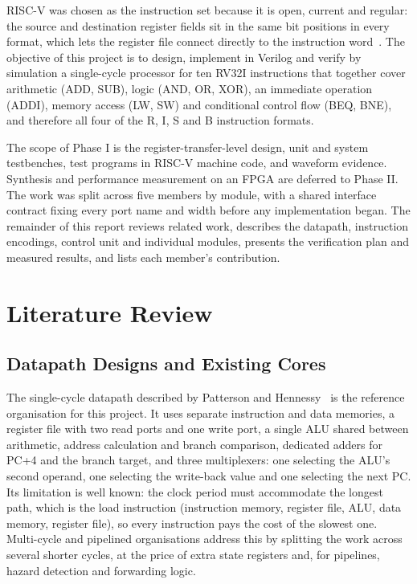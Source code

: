 \documentclass[conference]{IEEEtran}
\begin{document}
RISC-V was chosen as the instruction set because it is open, current and
regular: the source and destination register fields sit in the same bit
positions in every format, which lets the register file connect directly to
the instruction word~\cite{riscv_unpriv_2026,waterman2016design}. The
objective of this project is to design, implement in Verilog and verify by
simulation a single-cycle processor for ten RV32I instructions that together
cover arithmetic (ADD, SUB), logic (AND, OR, XOR), an immediate operation
(ADDI), memory access (LW, SW) and conditional control flow (BEQ, BNE), and
therefore all four of the R, I, S and B instruction formats.

The scope of Phase I is the register-transfer-level design, unit and system
testbenches, test programs in RISC-V machine code, and waveform evidence.
Synthesis and performance measurement on an FPGA are deferred to Phase II.
The work was split across five members by module, with a shared interface
contract fixing every port name and width before any implementation began.
The remainder of this report reviews related work, describes the datapath,
instruction encodings, control unit and individual modules, presents the
verification plan and measured results, and lists each member's contribution.

\section{Literature Review}


\subsection{Datapath Designs and Existing Cores}
The single-cycle datapath described by Patterson and
Hennessy~\cite{patterson2020computer} is the reference organisation for this
project. It uses separate instruction and data memories, a register file with
two read ports and one write port, a single ALU shared between arithmetic,
address calculation and branch comparison, dedicated adders for PC+4 and the
branch target, and three multiplexers: one selecting the ALU's second operand,
one selecting the write-back value and one selecting the next PC. Its
limitation is well known: the clock period must accommodate the longest path,
which is the load instruction (instruction memory, register file, ALU, data
memory, register file), so every instruction pays the cost of the slowest one.
Multi-cycle and pipelined organisations address this by splitting the work
across several shorter cycles, at the price of extra state registers and, for
pipelines, hazard detection and forwarding logic.
\end{document}
